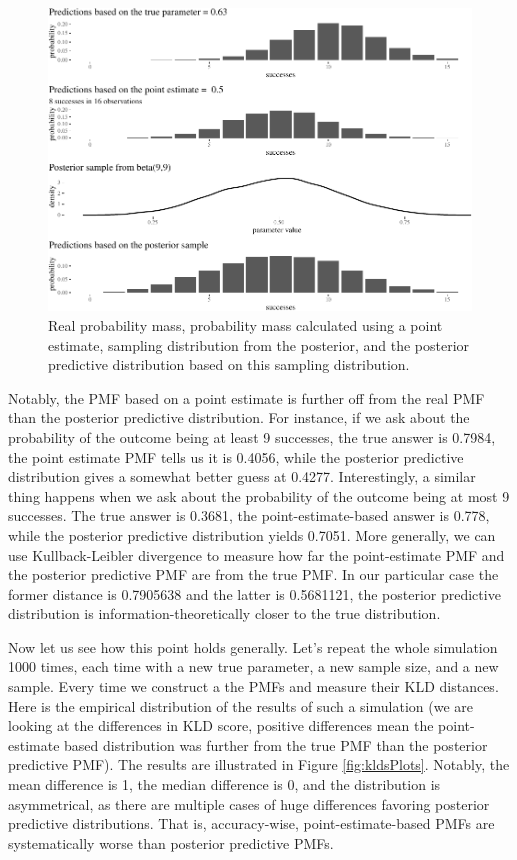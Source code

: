 \documentclass[
  10pt,
  dvipsnames,enabledeprecatedfontcommands]{scrartcl}
\begin{document}
\begin{figure}[H]

\begin{center}\includegraphics[width=0.9\linewidth]{chapter-outline_files/figure-latex/fig:posteriorPrediction2-1} \end{center}


\caption{Real probability mass, probability mass calculated using a point estimate, sampling distribution from the posterior, and the posterior predictive distribution based on this sampling distribution.}
\label{fig:posteriorPrediction}
\end{figure}

Notably, the PMF based on a point estimate is further off from the real
PMF than the posterior predictive distribution. For instance, if we ask
about the probability of the outcome being at least 9 successes, the
true answer is 0.7984, the point estimate PMF tells us it is 0.4056,
while the posterior predictive distribution gives a somewhat better
guess at 0.4277. Interestingly, a similar thing happens when we ask
about the probability of the outcome being at most 9 successes. The true
answer is 0.3681, the point-estimate-based answer is 0.778, while the
posterior predictive distribution yields 0.7051. More generally, we can
use Kullback-Leibler divergence to measure how far the point-estimate
PMF and the posterior predictive PMF are from the true PMF. In our
particular case the former distance is 0.7905638 and the latter is
0.5681121, the posterior predictive distribution is
information-theoretically closer to the true distribution.

Now let us see how this point holds generally. Let's repeat the whole
simulation 1000 times, each time with a new true parameter, a new sample
size, and a new sample. Every time we construct a the PMFs and measure
their KLD distances. Here is the empirical distribution of the results
of such a simulation (we are looking at the differences in KLD score,
positive differences mean the point-estimate based distribution was
further from the true PMF than the posterior predictive PMF). The
results are illustrated in Figure \ref{fig:kldsPlots}. Notably, the mean
difference is 1, the median difference is 0, and the distribution is
asymmetrical, as there are multiple cases of huge differences favoring
posterior predictive distributions. That is, accuracy-wise,
point-estimate-based PMFs are systematically worse than posterior
predictive PMFs.
\end{document}
